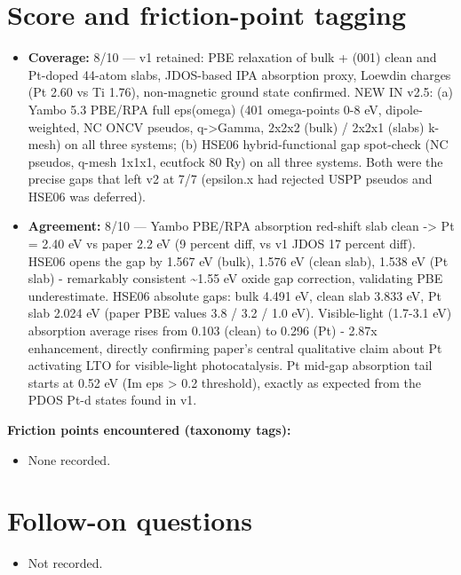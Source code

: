 \documentclass[11pt]{article}
\begin{document}
\section{Score and friction-point tagging}\label{sec:friction}
\begin{itemize}
\item \textbf{Coverage:} 8/10 --- v1 retained: PBE relaxation of bulk + (001) clean and Pt-doped 44-atom slabs, JDOS-based IPA absorption proxy, Loewdin charges (Pt 2.60 vs Ti 1.76), non-magnetic ground state confirmed. NEW IN v2.5: (a) Yambo 5.3 PBE/RPA full eps(omega) (401 omega-points 0-8 eV, dipole-weighted, NC ONCV pseudos, q-\textgreater{}Gamma, 2x2x2 (bulk) / 2x2x1 (slabs) k-mesh) on all three systems; (b) HSE06 hybrid-functional gap spot-check (NC pseudos, q-mesh 1x1x1, ecutfock 80 Ry) on all three systems. Both were the precise gaps that left v2 at 7/7 (epsilon.x had rejected USPP pseudos and HSE06 was deferred).
\item \textbf{Agreement:} 8/10 --- Yambo PBE/RPA absorption red-shift slab clean -\textgreater{} Pt = 2.40 eV vs paper 2.2 eV (9 percent diff, vs v1 JDOS 17 percent diff). HSE06 opens the gap by 1.567 eV (bulk), 1.576 eV (clean slab), 1.538 eV (Pt slab) - remarkably consistent \textasciitilde{}1.55 eV oxide gap correction, validating PBE underestimate. HSE06 absolute gaps: bulk 4.491 eV, clean slab 3.833 eV, Pt slab 2.024 eV (paper PBE values 3.8 / 3.2 / 1.0 eV). Visible-light (1.7-3.1 eV) absorption average rises from 0.103 (clean) to 0.296 (Pt) - 2.87x enhancement, directly confirming paper's central qualitative claim about Pt activating LTO for visible-light photocatalysis. Pt mid-gap absorption tail starts at 0.52 eV (Im eps \textgreater{} 0.2 threshold), exactly as expected from the PDOS Pt-d states found in v1.
\end{itemize}

\noindent\textbf{Friction points encountered (taxonomy tags):}
\begin{itemize}
\item None recorded.
\end{itemize}

\section{Follow-on questions}
\begin{itemize}
\item Not recorded.
\end{itemize}
\end{document}
